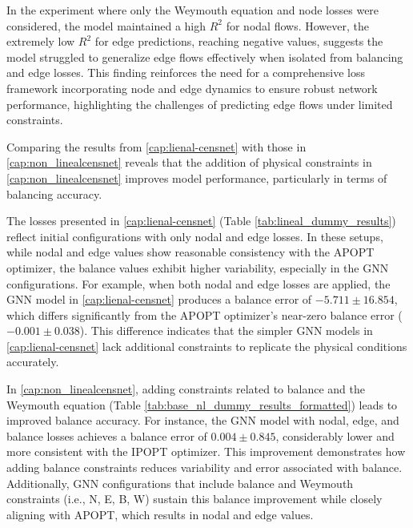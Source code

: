 In the experiment where only the Weymouth equation and node losses were considered, the model maintained a high $R^2$ for nodal flows. However, the extremely low $R^2$ for edge predictions, reaching negative values, suggests the model struggled to generalize edge flows effectively when isolated from balancing and edge losses. This finding reinforces the need for a comprehensive loss framework incorporating node and edge dynamics to ensure robust network performance, highlighting the challenges of predicting edge flows under limited constraints.

Comparing the results from \cref{cap:lienal-censnet} with those in \cref{cap:non_linealcensnet} reveals that the addition of physical constraints in \cref{cap:non_linealcensnet} improves model performance, particularly in terms of balancing accuracy.

The losses presented in \cref{cap:lienal-censnet} (Table \ref{tab:lineal_dummy_results}) reflect initial configurations with only nodal and edge losses. In these setups, while nodal and edge values show reasonable consistency with the APOPT optimizer, the balance values exhibit higher variability, especially in the GNN configurations. For example, when both nodal and edge losses are applied, the GNN model in \cref{cap:lienal-censnet} produces a balance error of \(-5.711 \pm 16.854\), which differs significantly from the APOPT optimizer's near-zero balance error (\(-0.001 \pm 0.038\)). This difference indicates that the simpler GNN models in \cref{cap:lienal-censnet} lack additional constraints to replicate the physical conditions accurately.

In \cref{cap:non_linealcensnet}, adding constraints related to balance and the Weymouth equation (Table \ref{tab:base_nl_dummy_results_formatted}) leads to improved balance accuracy. For instance, the GNN model with nodal, edge, and balance losses achieves a balance error of \(0.004 \pm 0.845\), considerably lower and more consistent with the IPOPT optimizer. This improvement demonstrates how adding balance constraints reduces variability and error associated with balance. Additionally, GNN configurations that include balance and Weymouth constraints (i.e., N, E, B, W) sustain this balance improvement while closely aligning with APOPT, which results in nodal and edge values.




